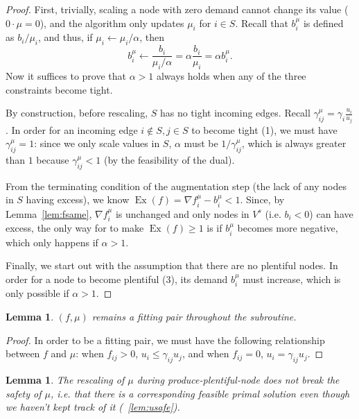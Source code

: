 \documentclass[11pt]{article}
\newtheorem{lemma}[theorem]{Lemma}
\theoremstyle{definition}
\theoremstyle{definition}
\newcommand{\fu}{f^{\mu}}
\newcommand{\nfiu}{\nabla \fu_i}
\newcommand{\biu}{b_{i}^{\mu}}
\newcommand{\gij}{\gamma_{ij}}
\newcommand{\giij}{\gamma_{ij}^{\mu}}
\newcommand{\vsrc}{V^{s}}
\newcommand{\fp}{(f,\mu)}
\DeclareMathOperator{\Ex}{Ex}
\begin{document}
\begin{proof}
	First, trivially, scaling a node with zero demand cannot change its value
	($0\cdot\mu=0$), and the algorithm only updates $\mu_i$ for $i \in S$. Recall
	that $\biu$ is defined as $b_i / \mu_i$, and thus, if $\mu_i\leftarrow \mu_i / \alpha$,
	then
	\[ \biu \leftarrow \frac{b_i}{\mu_i / \alpha} = \alpha\frac{b_i}{\mu_i} = \alpha \biu. \] 
	Now it suffices to prove that $\alpha > 1$ always holds when any of the three
	constraints become tight.
	
	By construction, before rescaling, $S$ has no tight
	incoming edges. Recall $\giij = \gamma_i\frac{u_i}{u_j}$. In order for an
	incoming edge $i \notin S, j\in S$ to become tight (1), we must have $\giij=1$:
	since we only scale values in $S$, $\alpha$ must be ${1}/{\giij}$, which is
	always greater than $1$ because $\giij < 1$ (by the feasibility of the dual).

	From the terminating condition of the augmentation step (the lack of any nodes
	in $S$ having excess), we know $\Ex(f) = \nfiu - \biu < 1$. Since, by
	Lemma~\ref{lem:fsame}, $\nfiu$ is unchanged and only nodes in $\vsrc$ (i.e. $b_i<0$)
	can have excess, the only way for to make $\Ex(f) \ge 1$ is if $\biu$ becomes
	more negative, which only happens if $\alpha > 1$. 
	
	Finally, we start out with the assumption that there are no plentiful nodes.
	In order for a node to become plentiful (3), its demand $\biu$ must increase,
	which is only possible if $\alpha > 1$.
\end{proof}
\begin{lemma}
	\label{lem:still-fit}
	$\fp$ remains a fitting pair throughout the subroutine.
\end{lemma}
\begin{proof}
	In order to be a fitting pair, we must have the following relationship between
	$f$ and $\mu$: when $f_{ij} > 0$, $u_i \le \gij u_j$, and when $f_{ij} = 0$, 
	$u_i = \gij u_j$. 
\end{proof}
\begin{lemma}
	The rescaling of $\mu$ during produce-plentiful-node does not break 
	the safety of $\mu$, i.e. that there is a corresponding feasible primal
	solution even though we haven't kept track of it (~\ref{lem:usafe}).
\end{lemma}
\end{document}
